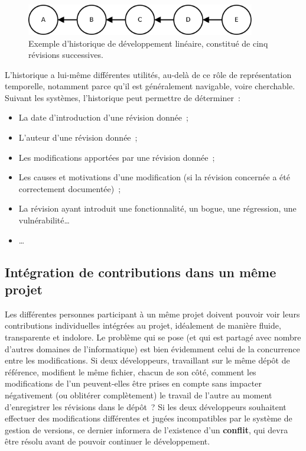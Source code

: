 \begin{figure}[h!]
  \includegraphics[width=10cm]{figures/historiqueLineaire}
  \caption{Exemple d'historique de développement linéaire, constitué
    de cinq révisions successives.\label{fig:historiqueLineaire}}
\end{figure}


L'historique a lui-même différentes utilités, au-delà de ce rôle de
représentation temporelle, notamment parce qu'il est généralement
navigable, voire cherchable. Suivant les systèmes, l'historique peut
permettre de déterminer~:
\begin{itemize}
\item La date d'introduction d'une révision donnée~;
\item L'auteur d'une révision donnée~;
\item Les modifications apportées par une révision donnée~;
\item Les causes et motivations d'une modification (si la révision
  concernée a été correctement documentée)~;
\item La révision ayant introduit une fonctionnalité, un
  bogue, une régression, une
  vulnérabilité\ldots
\item \ldots
\end{itemize}

\subsection{Intégration de contributions dans un même projet} %

Les différentes personnes participant à un même projet doivent pouvoir
voir leurs contributions individuelles intégrées au projet, idéalement
de manière fluide, transparente et indolore. Le problème qui se pose
(et qui est partagé avec nombre d'autres domaines de l'informatique)
est bien évidemment celui de la concurrence entre les
modifications. Si deux développeurs, travaillant sur le même dépôt de
référence, modifient le même fichier, chacun de son côté, comment les
modifications de l'un peuvent-elles être prises en compte sans
impacter négativement (ou oblitérer complètement) le travail de
l'autre au moment d'enregistrer les révisions dans le dépôt~? Si les
deux développeurs souhaitent effectuer des modifications différentes
et jugées incompatibles par le système de gestion de versions, ce
dernier informera de l'existence d'un \textbf{conflit},
qui devra être résolu avant de pouvoir continuer le développement.

